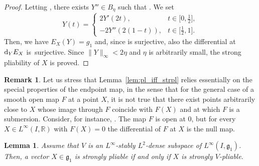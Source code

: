 \documentclass[pdftex]{sigma}
\numberwithin{equation}{section}
\newtheorem{Lemma}[Theorem]{Lemma}
\theoremstyle{definition}
\newtheorem{Remark}[Theorem]{Remark}
\begin{document}
\begin{proof}
Letting , there exists $Y''\in B_\eta$ such that . We set
 \begin{equation*}
 Y(t)=
 \begin{cases}
 2Y'(2t), & t\in\bigl[0,\frac12\bigr],\\
 -2Y''(2(1-t)), & t\in\bigl[\frac12,1\bigr].
 \end{cases}
 \end{equation*}
 Then, we have $E_X(Y)=g_1$ and, since  is surjective, also the differential at~${\rm d}_YE_{X}$ is~surjective.
 Since $\|Y\|_\infty<2\eta$ and $\eta$ is arbitrarily small, the strong pliability of $X$ is proved.
\end{proof}

\begin{Remark}Let us stress that
Lemma~\ref{lem:pl_iff_strpl}
relies essentially on the special
properties of the endpoint map, in the sense that for the general case of a smooth open map $F$ at a point $X$, it is not true that there exist points arbitrarily close to $X$ whose image through $F$ coincide with $F(X)$ and at which $F$ is a submersion. Consider, for instance, . The map $F$ is open at $0$, but for every $X\in L^\infty(I,\mathbb{R})$ with $F(X)=0$ the differential of $F$ at $X$ is the null map.
\end{Remark}

\begin{Lemma} \label{lem:pl_iff_strpl2}
 Assume that
 $V$ is an
 $L^\infty$-stably $L^2$-dense subspace of
 $L^\infty(I,{\mathfrak g}_1)$.
 Then, a vector $X\in{\mathfrak g}_1$ is strongly
 pliable if and only if
 $X$ is strongly $V$-pliable.
\end{Lemma}
\end{document}

